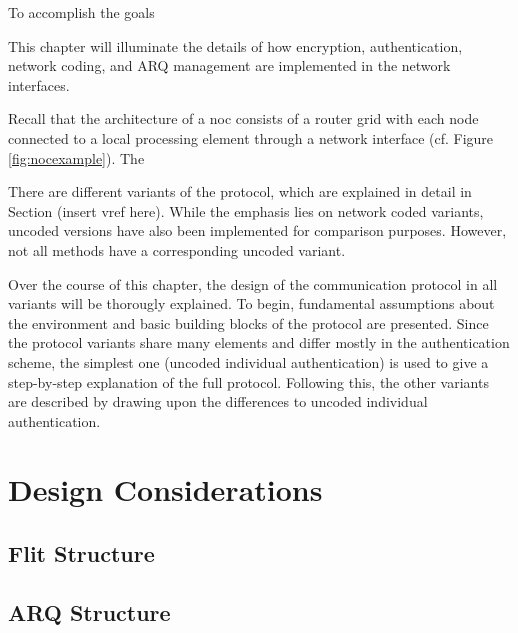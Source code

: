 To accomplish the goals 

This chapter will illuminate the details of how encryption, authentication, network coding, and ARQ management are implemented in the network
interfaces.

Recall that the architecture of a \gls{noc} consists of a router grid with each node connected to a local processing element through a network
interface (cf. Figure \vref{fig:nocexample}). The 

There are different variants of the protocol, which are explained in detail in Section (insert vref here). While the emphasis lies on network coded
variants, uncoded versions have also been implemented for comparison purposes. However, not all methods have a corresponding uncoded variant.

Over the course of this chapter, the design of the communication protocol in all variants will be thorougly explained. To begin, fundamental
assumptions about the environment and basic building blocks of the protocol are presented. Since the protocol variants share many elements and differ
mostly in the authentication scheme, the simplest one (uncoded individual authentication) is used to give a step-by-step explanation of the full
protocol. Following this, the other variants are described by drawing upon the differences to uncoded individual authentication.

\section{Design Considerations}
\subsection{Flit Structure}

\subsection{ARQ Structure}

